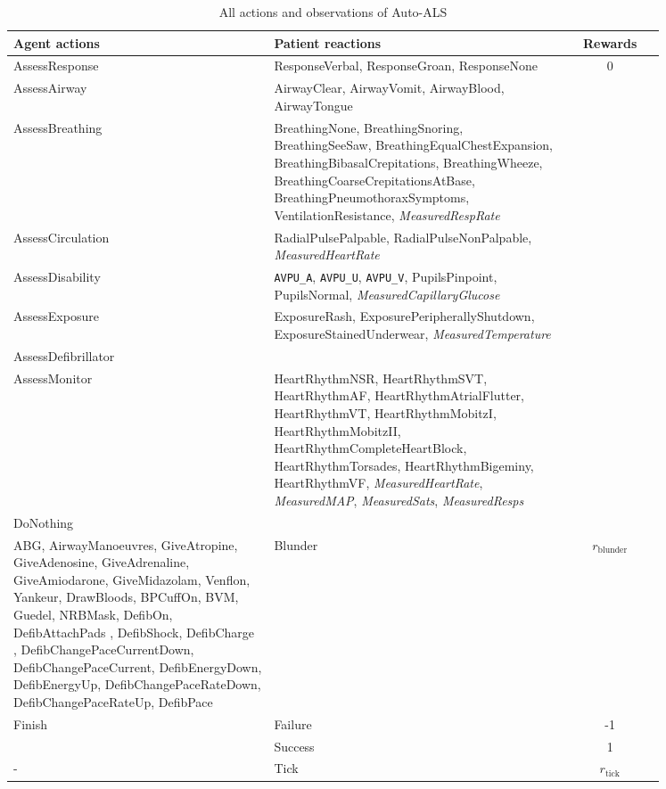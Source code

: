 \begin{table}[H]
\begin{tabular}{|p{0.4\linewidth}|p{0.45\linewidth}|c|}
\toprule
Agent actions &
  Patient reactions & Rewards
   \\
   \midrule
AssessResponse &
  ResponseVerbal,     ResponseGroan,     ResponseNone &
  \multirow{9}{*}{0} \\
AssessAirway &
  AirwayClear,     AirwayVomit,     AirwayBlood,     AirwayTongue &
   \\
AssessBreathing &
  BreathingNone,     BreathingSnoring,     BreathingSeeSaw,     BreathingEqualChestExpansion,     BreathingBibasalCrepitations,     BreathingWheeze,     BreathingCoarseCrepitationsAtBase,     BreathingPneumothoraxSymptoms,  VentilationResistance, \emph{MeasuredRespRate} &
   \\
AssessCirculation &
  RadialPulsePalpable,     RadialPulseNonPalpable, \emph{MeasuredHeartRate} &
   \\
AssessDisability &
  \verb|AVPU_A|,     \verb|AVPU_U|,     \verb|AVPU_V|, PupilsPinpoint,     PupilsNormal, \emph{MeasuredCapillaryGlucose} &
   \\
AssessExposure &
  ExposureRash,     ExposurePeripherallyShutdown,     ExposureStainedUnderwear, \emph{MeasuredTemperature} &
   \\
AssessDefibrillator &
   &
   \\
AssessMonitor &
  HeartRhythmNSR,
    HeartRhythmSVT,
    HeartRhythmAF,
    HeartRhythmAtrialFlutter,
    HeartRhythmVT,
    HeartRhythmMobitzI,
    HeartRhythmMobitzII,
    HeartRhythmCompleteHeartBlock,
    HeartRhythmTorsades,
    HeartRhythmBigeminy,
    HeartRhythmVF, \emph{MeasuredHeartRate}, \emph{MeasuredMAP}, \emph{MeasuredSats}, \emph{MeasuredResps} &
   \\
   DoNothing & & \\
   \midrule
ABG,     AirwayManoeuvres,     GiveAtropine,     GiveAdenosine,     GiveAdrenaline,     GiveAmiodarone,     GiveMidazolam,     Venflon,     Yankeur,     DrawBloods,     BPCuffOn,     BVM,     Guedel,     NRBMask,     DefibOn,     DefibAttachPads ,     DefibShock,     DefibCharge ,     DefibChangePaceCurrentDown,     DefibChangePaceCurrent,     DefibEnergyDown,     DefibEnergyUp,     DefibChangePaceRateDown,     DefibChangePaceRateUp,     DefibPace& 
   Blunder & $r_\text{blunder}$
   \\
   \midrule
   \multirow{2}{*}{Finish} & Failure & -1 \\
   & Success & 1 \\
   \midrule
   - & Tick & $r_\text{tick}$ \\
  \bottomrule
\end{tabular}
\caption{All actions and observations of Auto-ALS}
\label{tab:auto-als}
\end{table}

